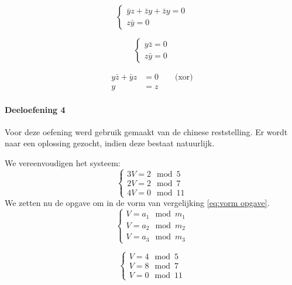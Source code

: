 \documentclass[12pt]{article}
\newcommand{\ov}[1]{\bar{#1}}
\begin{document}
    \begin{equation}
    	\begin{cases}
    		\ov{y}z + \ov{z}y + \ov{z}y = 0 \\
    		z\ov{y} = 0
    	\end{cases}
    \end{equation}

    \begin{equation}
    	\begin{cases}
    		y\ov{z} = 0 \\
    		z\ov{y} = 0
    	\end{cases}
    \end{equation}

	\begin{align}
    		y\ov{z} + \ov{y}z &= 0 \qquad \text{(xor)} \\
    		y &= z
    \end{align}    

	\paragraph{Deeloefening 4}
	
    Voor deze oefening werd gebruik gemaakt van de chinese reststelling. Er wordt naar een oplossing gezocht, indien deze bestaat natuurlijk.
    
    We vereenvoudigen het systeem:
	\begin{equation}
        \begin{cases}
            3V = 2 \mod 5 \\
            2V = 2 \mod 7 \\
            4V = 0 \mod 11
        \end{cases}
    \end{equation}
    We zetten nu de opgave om in de vorm van vergelijking \ref{eq:vorm opgave}.
    \begin{equation} \label{eq:vorm opgave}
        \begin{cases}
            V = a_1 \mod m_1 \\
            V = a_2 \mod m_2 \\
            V = a_3 \mod m_3
        \end{cases}
    \end{equation}
    
    \begin{equation}
        \begin{cases}
            V = 4 \mod 5 \\
            V = 8 \mod 7 \\
            V = 0 \mod 11
        \end{cases}
    \end{equation}
    
\end{document}
